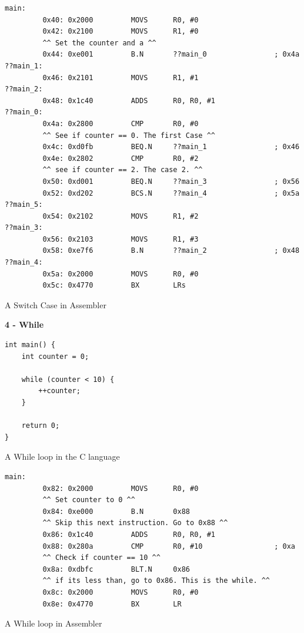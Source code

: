 \documentclass[12pt,a4paper]{report}
\begin{document}
\begin{normalsize}
\lstset{language=[x86masm]Assembler}
\begin{lstlisting}
main:
         0x40: 0x2000         MOVS      R0, #0
         0x42: 0x2100         MOVS      R1, #0
         ^^ Set the counter and a ^^
         0x44: 0xe001         B.N       ??main_0                ; 0x4a
??main_1:
         0x46: 0x2101         MOVS      R1, #1
??main_2:
         0x48: 0x1c40         ADDS      R0, R0, #1
??main_0:
         0x4a: 0x2800         CMP       R0, #0
         ^^ See if counter == 0. The first Case ^^
         0x4c: 0xd0fb         BEQ.N     ??main_1                ; 0x46
         0x4e: 0x2802         CMP       R0, #2
         ^^ see if counter == 2. The case 2. ^^
         0x50: 0xd001         BEQ.N     ??main_3                ; 0x56
         0x52: 0xd202         BCS.N     ??main_4                ; 0x5a
??main_5:
         0x54: 0x2102         MOVS      R1, #2
??main_3:
         0x56: 0x2103         MOVS      R1, #3
         0x58: 0xe7f6         B.N       ??main_2                ; 0x48
??main_4:
         0x5a: 0x2000         MOVS      R0, #0
         0x5c: 0x4770         BX        LRs
\end{lstlisting}	
\begin{center}
\small{A Switch Case in Assembler}
\end{center}


\textbf{4 - While} \\

\lstset{language=C}
\begin{lstlisting}
int main() {
    int counter = 0;

    while (counter < 10) {
        ++counter;
    }

    return 0;
}
\end{lstlisting}	
\begin{center}
\small{A While loop in the C language}
\end{center}

\lstset{language=[x86masm]Assembler}
\begin{lstlisting}
main:
         0x82: 0x2000         MOVS      R0, #0
         ^^ Set counter to 0 ^^
         0x84: 0xe000         B.N       0x88
         ^^ Skip this next instruction. Go to 0x88 ^^
         0x86: 0x1c40         ADDS      R0, R0, #1
         0x88: 0x280a         CMP       R0, #10                 ; 0xa
         ^^ Check if counter == 10 ^^
         0x8a: 0xdbfc         BLT.N     0x86
         ^^ if its less than, go to 0x86. This is the while. ^^
         0x8c: 0x2000         MOVS      R0, #0
         0x8e: 0x4770         BX        LR
\end{lstlisting}	
\begin{center}
\small{A While loop in Assembler}
\end{center}



\end{normalsize}
\end{document}
